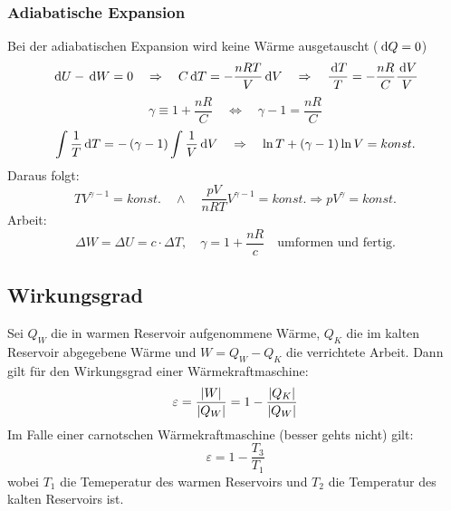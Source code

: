 \subsubsection{Adiabatische Expansion}
Bei der adiabatischen Expansion wird keine Wärme ausgetauscht ($\,\mathrm{d} Q = 0$)
\begin{equation}
\,\mathrm{d} U - \,\mathrm{d} W = 0 \quad\Rightarrow\quad C \,\mathrm{d} T = - \frac{nRT}{V}\,\mathrm{d} V \quad\Rightarrow\quad \frac{\,\mathrm{d} T}{T} = - \frac{nR}{C}\frac{\,\mathrm{d} V}{V}
\end{equation}
\begin{equation}
\gamma \equiv 1 + \frac{nR}{C} \quad\Leftrightarrow\quad \gamma - 1 = \frac{nR}{C}
\end{equation}
\begin{equation}
\int \frac{1}{T}\,\mathrm{d} T = - \left(\gamma - 1\right) \int\frac{1}{V} \,\mathrm{d} V \quad\Rightarrow\quad \ln T + \left( \gamma - 1 \right) \ln V = konst.
\end{equation}
Daraus folgt:
\begin{equation}
TV^{\gamma - 1} = konst. \quad\wedge\quad \frac{pV}{nRT}V^{\gamma - 1} = konst. \Rightarrow pV^\gamma = konst.
\end{equation}
Arbeit:
\begin{equation}
\Delta W = \Delta U = c \cdot \Delta T, \quad \gamma = 1 + \frac{nR}{c} \quad \text{umformen und fertig.}
\end{equation}
\subsection{Wirkungsgrad}
Sei $Q_W$ die in warmen Reservoir aufgenommene Wärme, $Q_K$ die im kalten Reservoir abgegebene Wärme und $W = Q_W - Q_K$ die verrichtete Arbeit. Dann gilt für den Wirkungsgrad einer Wärmekraftmaschine:
\begin{equation}
\varepsilon = \frac{\left| W \right|}{\left| Q_W \right|} = 1 - \frac{\left| Q_K \right|}{\left| Q_W \right|}
\end{equation}
Im Falle einer carnotschen Wärmekraftmaschine (besser gehts nicht) gilt:
\begin{equation}
\varepsilon = 1 - \frac{T_3}{T_1}
\end{equation}
wobei $T_1$ die Temeperatur des warmen Reservoirs und $T_2$ die Temperatur des kalten Reservoirs ist.